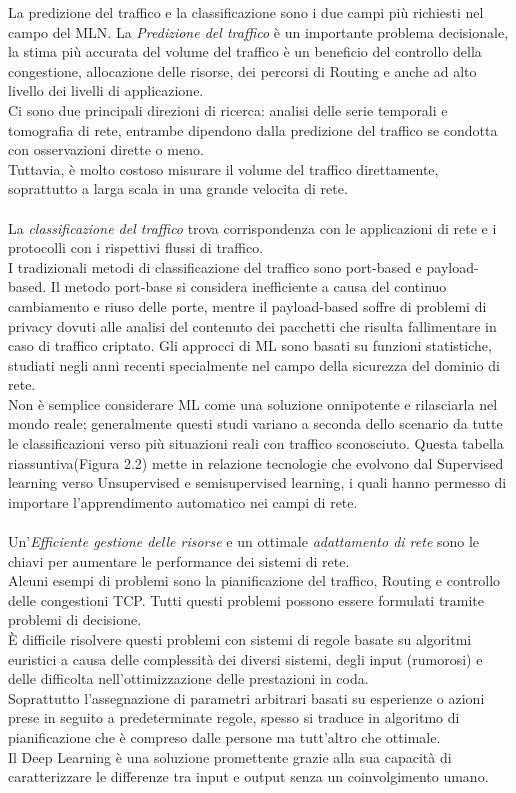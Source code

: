 \documentclass[../tesi.tex]{subfiles}
\begin{document}
La predizione del traffico e la classificazione sono i due campi più richiesti nel campo del MLN.
La \textit{Predizione del traffico} è un importante problema decisionale, la stima più accurata del volume del traffico è un beneficio del controllo della congestione, allocazione delle risorse, dei percorsi di Routing e anche ad alto livello dei livelli di applicazione.\\
Ci sono due principali direzioni di ricerca: analisi delle serie temporali e tomografia di rete, entrambe dipendono dalla predizione del traffico se condotta con osservazioni dirette o meno.\\
Tuttavia, è molto costoso misurare il volume del traffico direttamente, soprattutto a larga scala in una grande velocita di rete.\\
\\
La \textit{classificazione del traffico} trova corrispondenza con le applicazioni di rete e i protocolli con i rispettivi flussi di traffico.\\
I tradizionali metodi di classificazione del traffico sono  \Gls{port-based} e \Gls{payload-based}. Il metodo port-base si considera inefficiente a causa del continuo cambiamento e riuso delle porte, mentre il payload-based soffre di problemi di privacy dovuti alle analisi del contenuto dei pacchetti che risulta fallimentare in caso di traffico criptato.
Gli approcci di ML sono basati su funzioni statistiche, studiati negli anni recenti specialmente nel campo della sicurezza del dominio di rete.\\
Non è semplice considerare ML come una soluzione onnipotente e rilasciarla nel mondo reale; generalmente questi studi variano a seconda dello scenario da tutte le classificazioni verso più situazioni reali con traffico sconosciuto. Questa tabella riassuntiva(Figura 2.2) mette in relazione tecnologie che evolvono dal Supervised learning verso Unsupervised e semisupervised learning, i quali hanno permesso di importare l’apprendimento automatico nei campi di rete.\\
\\
Un'\textit{Efficiente gestione delle risorse} e un ottimale \textit{adattamento di rete} sono le chiavi per aumentare le performance dei sistemi di rete.\\
Alcuni esempi di problemi sono la pianificazione del traffico, Routing e controllo delle congestioni TCP. Tutti questi problemi possono essere formulati tramite problemi di decisione.\\
È difficile risolvere questi problemi con sistemi di regole basate su algoritmi euristici a causa delle complessità dei diversi sistemi, degli input (rumorosi) e delle difficolta nell’ottimizzazione delle prestazioni in coda.\\
Soprattutto l'assegnazione di parametri arbitrari basati su esperienze o azioni prese in seguito a predeterminate regole, spesso si traduce in algoritmo di pianificazione che è compreso dalle persone ma tutt’altro che ottimale.\\
Il \Gls{Deep Learning} è una soluzione promettente grazie alla sua capacità di caratterizzare le differenze tra input e output senza un coinvolgimento umano.
\end{document}
